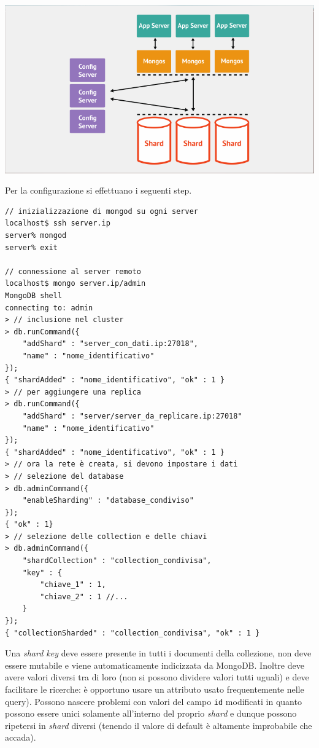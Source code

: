 \documentclass[a4page, 11pt]{article}
\begin{document}
\begin{center}
  \includegraphics[scale=0.40]{IMAGE6.png}
\end{center}

Per la configurazione si effettuano i seguenti step.
\begin{verbatim}
// inizializzazione di mongod su ogni server
localhost$ ssh server.ip
server% mongod
server% exit

// connessione al server remoto
localhost$ mongo server.ip/admin
MongoDB shell
connecting to: admin
> // inclusione nel cluster
> db.runCommand({
    "addShard" : "server_con_dati.ip:27018",
    "name" : "nome_identificativo"
});
{ "shardAdded" : "nome_identificativo", "ok" : 1 }
> // per aggiungere una replica
> db.runCommand({
    "addShard" : "server/server_da_replicare.ip:27018"
    "name" : "nome_identificativo"
});
{ "shardAdded" : "nome_identificativo", "ok" : 1 }
> // ora la rete è creata, si devono impostare i dati
> // selezione del database
> db.adminCommand({
    "enableSharding" : "database_condiviso"
});
{ "ok" : 1}
> // selezione delle collection e delle chiavi
> db.adminCommand({
    "shardCollection" : "collection_condivisa",
    "key" : {
        "chiave_1" : 1,
        "chiave_2" : 1 //...
    }
});
{ "collectionSharded" : "collection_condivisa", "ok" : 1 }
\end{verbatim}

Una \textit{shard key} deve essere presente in tutti i documenti della collezione, non deve essere mutabile e viene automaticamente indicizzata da MongoDB.
Inoltre deve avere valori diversi tra di loro (non si possono dividere valori tutti uguali) e deve facilitare le ricerche: è opportuno usare un attributo usato frequentemente nelle query).
Possono nascere problemi con valori del campo \verb|id| modificati in quanto possono essere unici solamente all'interno del proprio \textit{shard} e dunque possono ripetersi in \textit{shard} diversi (tenendo il valore di default è altamente improbabile che accada).

\newpage
\printbibliography[title={Letture di approfondimento}]
\end{document}
